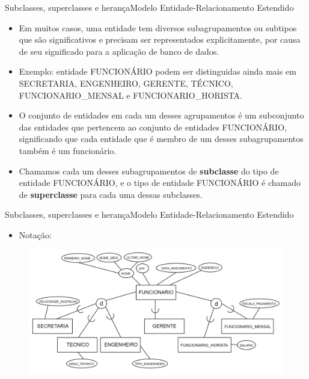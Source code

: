 \documentclass[t]{beamer}
\begin{document}

\begin{ftst}{Subclasses, superclasses e herança}{Modelo Entidade-Relacionamento Estendido}
\small
\begin{itemize}
    \item Em muitos casos, uma entidade tem diversos subagrupamentos ou subtipos que são significativos e precisam ser representados explicitamente, por causa de seu significado para a aplicação de banco de dados.
    \item Exemplo: entidade FUNCIONÁRIO podem ser distinguidas ainda mais em SECRETARIA, ENGENHEIRO, GERENTE, TÉCNICO, FUNCIONARIO\_MENSAL e FUNCIONARIO\_HORISTA.
    \item O conjunto de entidades em cada um desses agrupamentos é um subconjunto das entidades que pertencem ao conjunto de entidades FUNCIONÁRIO, significando que cada entidade que é membro de um desses subagrupamentos também é um funcionário.
    \item Chamamos cada um desses subagrupamentos de \textbf{subclasse} do tipo de entidade FUNCIONÁRIO, e o tipo de entidade FUNCIONÁRIO é chamado de \textbf{superclasse} para cada uma dessas subclasses.
\end{itemize}
\end{ftst}


\begin{ftst}{Subclasses, superclasses e herança}{Modelo Entidade-Relacionamento Estendido}
\begin{itemize}
    \item Notação:
\end{itemize}

\begin{figure}
    \centering
    \includegraphics[scale=0.13]{Figuras/02_1.png}
\end{figure}

\end{ftst}
\end{document}
